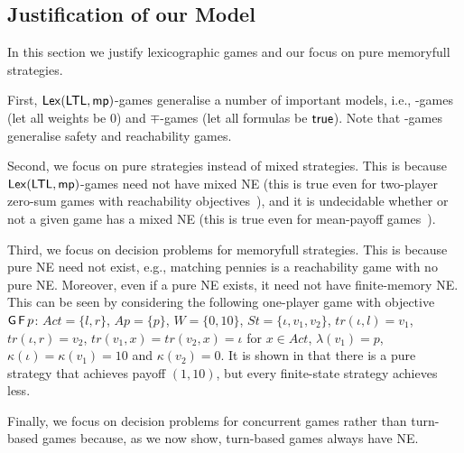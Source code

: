 \subsection{Justification of our Model}
In this section we justify lexicographic games and our focus on pure memoryfull strategies.

First, ${\sf Lex}(\mathsf{LTL},{\sf mp})$-games generalise a number of important models, i.e., \LTL-games (let all weights be $0$) and $\mp$-games 
(let all formulas be $\mathsf{true}$). Note that \LTL-games generalise safety and reachability games. 

Second, we focus on pure strategies instead of mixed strategies. This is because ${\sf Lex}(\mathsf{LTL},{\sf mp})$-games need not have mixed NE (this is true even for two-player zero-sum games with reachability objectives~\cite{DBLP:journals/corr/abs-1109-6220}), and it is undecidable whether or not a given game has a mixed NE (this is true even for mean-payoff games~\cite{DBLP:journals/corr/abs-1109-6220}).

Third, we focus on decision problems for memoryfull strategies. This is because pure NE need not exist, e.g., matching pennies is a reachability game with no pure NE. Moreover, even if a pure NE exists, it need not have finite-memory NE. This can be seen by considering the following one-player game with \LTL objective $\operatorname{\mathsf{G}} \operatorname{\mathsf{F}} p$: $Act = \{l,r\}$, $Ap = \{p\}$, $W = \{0,10\}$, $St = \{\iota,v_1,v_2\}$, $tr(\iota,l) = v_1$, $tr(\iota,r) = v_2$, $tr(v_1,x) = tr(v_2,x) = \iota$ for $x \in Act$, $\lambda(v_1) = p$, $\kappa(\iota) = \kappa(v_1) = 10$ and $\kappa(v_2) = 0$. It is shown in \cite[Example $1$]{DBLP:journals/corr/abs-1210-3539} that there is a pure strategy that achieves payoff $(1,10)$, but every finite-state strategy achieves less. 

Finally, we focus on decision problems for concurrent games rather than turn-based games because, as we now show, turn-based games always have NE.

